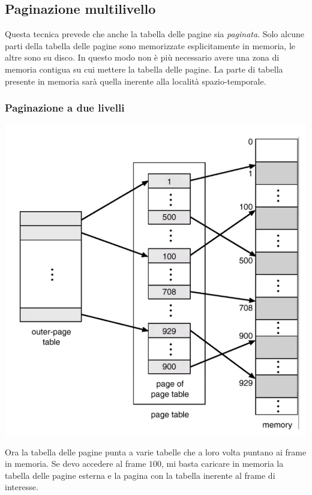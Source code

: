 \documentclass[a4paper,12pt, twoside]{report}
\begin{document}
\subsection{Paginazione multilivello}

Questa tecnica prevede che anche la tabella delle pagine sia \emph{paginata}. Solo alcune parti della 
tabella delle pagine sono memorizzate esplicitamente in memoria, le altre sono su disco. In questo modo non
\`e pi\`u necessario avere una zona di memoria contigua su cui mettere la tabella delle pagine. 
La parte di tabella presente in memoria sar\`a quella inerente alla localit\`a spazio-temporale.

\subsubsection{Paginazione a due livelli}
\begin{multicols}{2}
\includegraphics[scale=0.1]{2level}

Ora la tabella delle pagine punta a varie tabelle che a loro volta puntano ai frame in memoria. Se devo 
accedere al frame $100$, mi basta caricare in memoria la tabella delle pagine esterna e la pagina con la 
tabella inerente al frame di interesse. 
\end{multicols}
\end{document}
